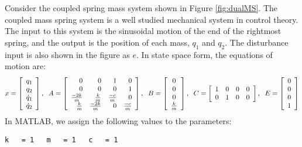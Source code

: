 \documentclass{amsart}
\theoremstyle{definition}
\theoremstyle{remark}
\numberwithin{equation}{section}
\begin{document}
Consider the coupled spring mass system shown in Figure \ref{fig:dualMS}. The coupled mass spring system is a well studied mechanical system in control theory. The input to this system is the sinusoidal motion of the end of the rightmost spring, and the output is the position of each mass, $q_1$ and $q_2$. The disturbance input is also shown in the figure as $e$. In state space form, the equations of motion are: 
\begin{equation}
\begin{aligned}
x = \displaystyle \left [ \begin{array}{r}
q_1 \\
q_2 \\
\dot{q}_1 \\
\dot{q}_2 \\
\end{array} \right ], \hspace{2mm}
A = \displaystyle \left [ \begin{array}{rrrr}
0 & 0 & 1 & 0 \\
0 & 0 & 0 & 1 \\
\frac{-2k}{m} & \frac{k}{m} & \frac{-c}{m} & 0 \\
\frac{k}{m} & \frac{-2k}{m} & 0 & \frac{-c}{m}
 \end{array} \right ], \hspace{2mm} 
B= \displaystyle \left [ \begin{array}{c} 
 0 \\
 0\\
 0  \\
\frac{k}{m}
 \end{array} \right ], \hspace{2mm} 
C = \displaystyle \left [ \begin{array}{rrrr} 
1 & 0 & 0 & 0 \\ 
0 & 1 & 0 & 0 \\
\end{array} \right ], \hspace{2mm} 
E = \displaystyle \left [ \begin{array}{r} 
0\\ 
0\\
0\\
1 \end{array} \right ]
\end{aligned}
\end{equation}
In MATLAB, we assign the following values to the parameters:
\begin{verbatim}
k   = 1   m   = 1   c   = 1 \end{verbatim}
\end{document}
